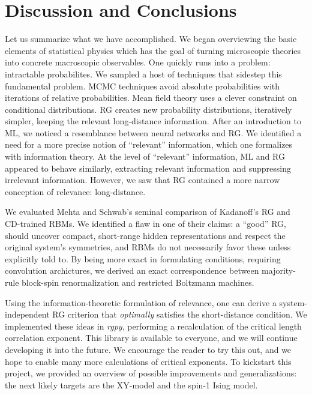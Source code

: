 \chapter{Discussion and Conclusions}\label{sec:discussion}
Let us summarize what we have accomplished.  We began overviewing the
basic elements of statistical physics which has the goal of turning
microscopic theories into concrete macroscopic observables.  One
quickly runs into a problem: intractable probabilites.  We sampled a
host of techniques that sidestep this fundamental problem. MCMC
techniques avoid absolute probabilities with iterations of relative
probabilities. Mean field theory uses a clever constraint on
conditional distributions. RG creates new probability distributions,
iteratively simpler, keeping the relevant long-distance information.
After an introduction to ML, we noticed a resemblance between neural
networks and RG\@. We identified a need for a more precise notion of
``relevant'' information, which one formalizes with information
theory. At the level of ``relevant'' information, ML and RG appeared
to behave similarly, extracting relevant information and suppressing
irrelevant information. However, we saw that RG contained a more
narrow conception of relevance: long-distance.

We evaluated Mehta and Schwab's seminal comparison of Kadanoff's RG
and CD-trained RBMs. We identified a flaw in one of their claims: a
``good'' RG, should uncover compact, short-range hidden
representations and respect the original system's symmetries, and RBMs
do not necessarily favor these unless explicitly told to. By being
more exact in formulating conditions, requiring convolution archictures,
we derived an exact correspondence between majority-rule
block-spin renormalization and restricted Boltzmann machines.

Using the information-theoretic formulation of relevance, one can
derive a system-independent RG criterion that \textit{optimally}
satisfies the short-distance condition. We implemented these ideas in
\textit{rgpy}, performing a recalculation of the critical length
correlation exponent. This library is available to everyone, and we
will continue developing it into the future. We encourage the reader
to try this out, and we hope to enable many more calculations of
critical exponents.  To kickstart this project, we provided an
overview of possible improvements and generalizations: the next likely
targets are the XY-model and the spin-1 Ising model.

